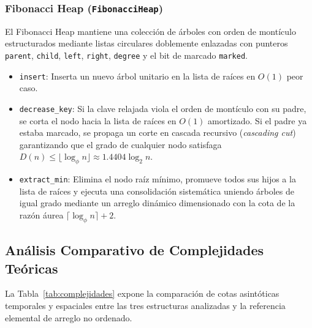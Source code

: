 \subsubsection{Fibonacci Heap (\texttt{FibonacciHeap})}
El Fibonacci Heap \parencite{fredman1987fibonacci} mantiene una colección de árboles con orden de montículo estructurados mediante listas circulares doblemente enlazadas con punteros \texttt{parent}, \texttt{child}, \texttt{left}, \texttt{right}, \texttt{degree} y el bit de marcado \texttt{marked}.
\begin{itemize}
    \item \texttt{insert}: Inserta un nuevo árbol unitario en la lista de raíces en $O(1)$ peor caso.
    \item \texttt{decrease\_key}: Si la clave relajada viola el orden de montículo con su padre, se corta el nodo hacia la lista de raíces en $O(1)$ amortizado. Si el padre ya estaba marcado, se propaga un corte en cascada recursivo (\textit{cascading cut}) garantizando que el grado de cualquier nodo satisfaga $D(n) \le \lfloor \log_\phi n \rfloor \approx 1.4404 \log_2 n$.
    \item \texttt{extract\_min}: Elimina el nodo raíz mínimo, promueve todos sus hijos a la lista de raíces y ejecuta una consolidación sistemática uniendo árboles de igual grado mediante un arreglo dinámico dimensionado con la cota de la razón áurea $\lceil \log_\phi n \rceil + 2$.
\end{itemize}

\subsection{Análisis Comparativo de Complejidades Teóricas}
La Tabla~\ref{tab:complejidades} expone la comparación de cotas asintóticas temporales y espaciales entre las tres estructuras analizadas y la referencia elemental de arreglo no ordenado.


